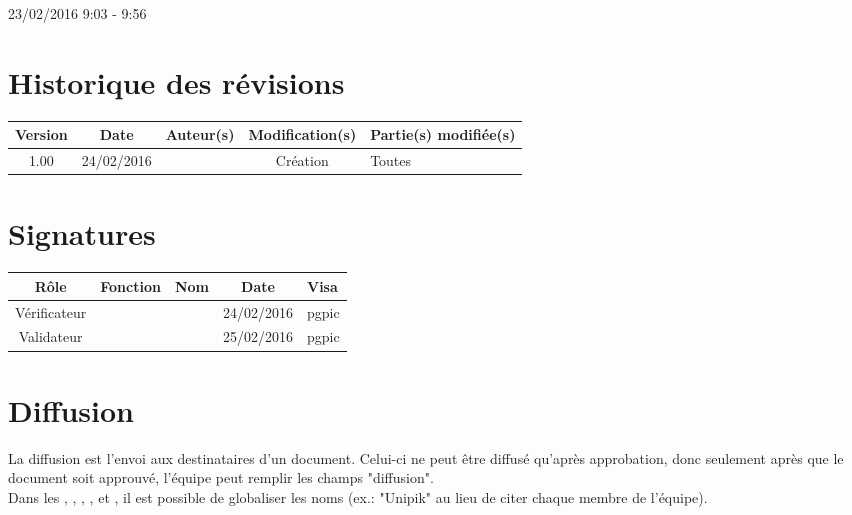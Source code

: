 \documentclass [a4paper] {article}
\begin{document}
\rhead{}

23/02/2016
\hfill   
\hfill 	9:03 - 9:56 				%



\section*{Historique des révisions}
\begin{center}
			\begin{tabular}{| c | c | c | c | p{4cm} |}
				\hline
				\rowcolor{Gray}
				Version & Date & Auteur(s) & Modification(s) & Partie(s) modifiée(s)		 \\
				\hline
				1.00 & 24/02/2016 & \Pierre & Création & Toutes \\
		\hline		
			\end{tabular}
		\end{center}

\section*{Signatures}

		\begin{center}
			\begin{tabular}{| c | c | c | c | p{4cm} |}
				\hline
				\rowcolor{Gray}
				Rôle & Fonction & Nom & Date & Visa		 \\
				\hline
				Vérificateur & \RQA & \Kafui & 24/02/2016 & pgpic \\[30pt]
				\hline
				Validateur & \CP & \Sergi & 25/02/2016 & pgpic \\[30pt]	
				\hline
			\end{tabular}
		\end{center}


\section{Diffusion}
La diffusion est l'envoi aux destinataires d'un document. Celui-ci ne peut être diffusé qu'après approbation, donc seulement après que le document soit approuvé, l'équipe peut remplir les champs "diffusion". \\
Dans les \DSE{}, \DSI{}, \PTV{}, \PQ{}, \PGC{} et \CDR{}, il est possible de globaliser les noms (ex.: "Unipik" au lieu de citer chaque membre de l'équipe).
\end{document}
